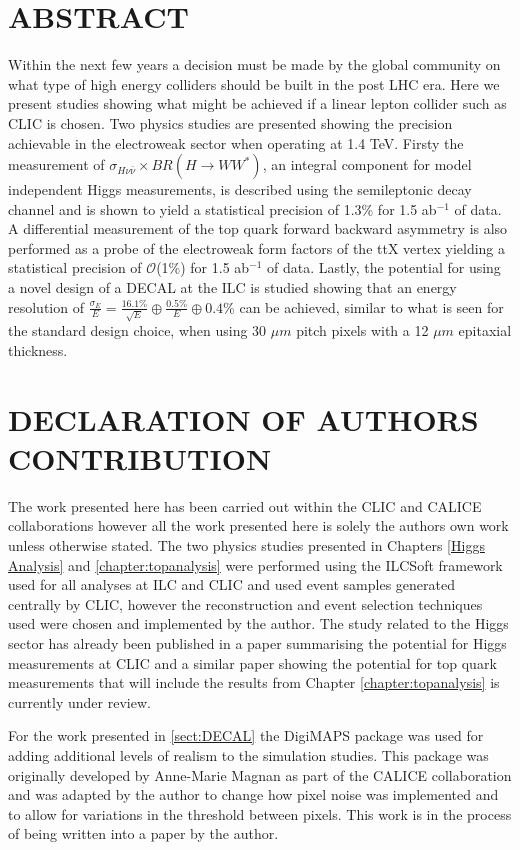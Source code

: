 \chapter*{ABSTRACT}
%
Within the next few years a decision must be made by the global community on what type of high energy colliders should be built in the post LHC era. Here we present studies showing what might be achieved if a linear lepton collider such as \ac{CLIC} is chosen. Two physics studies are presented showing the precision achievable in the electroweak sector when operating at 1.4 TeV. Firsty the measurement of $\sigma_{H\nu\bar{\nu}} \times BR(H\rightarrow WW^*)$, an integral component for model independent Higgs measurements, is described using the semileptonic decay channel and is shown to yield a statistical precision of 1.3\% for 1.5 ab$^{-1}$ of data. A differential measurement of the top quark forward backward asymmetry is also performed as a probe of the electroweak form factors of the ttX vertex yielding a statistical precision of $\mathcal{O}$(1\%) for 1.5 ab$^{-1}$ of data. Lastly, the potential for using a novel design of a \ac{DECAL} at the \ac{ILC} is studied showing that an energy resolution of $\frac{\sigma_E}{E}=\frac{16.1\%}{\sqrt{E}} \oplus \frac{0.5\%}{E} \oplus 0.4\%$ can be achieved, similar to what is seen for the standard design choice, when using 30 $\mu m$ pitch pixels with a 12 $\mu m$ epitaxial thickness.

%
\clearpage
\chapter*{DECLARATION OF AUTHORS CONTRIBUTION}
%
The work presented here has been carried out within the \ac{CLIC} and \ac{CALICE} collaborations however all the work presented here is solely the authors own work unless otherwise stated. The two physics studies presented in Chapters \ref{Higgs Analysis} and \ref{chapter:topanalysis} were performed using the ILCSoft framework used for all analyses at \ac{ILC} and \ac{CLIC} and used event samples generated centrally by \ac{CLIC}, however the reconstruction and event selection techniques used were chosen and implemented by the author. The study related to the Higgs sector has already been published in a paper summarising the potential for Higgs measurements\cite{Abramowicz:2016zbo} at \ac{CLIC} and a similar paper showing the potential for top quark measurements that will include the results from Chapter \ref{chapter:topanalysis} is currently under review.

For the work presented in \ref{sect:DECAL} the DigiMAPS package was used for adding additional levels of realism to the simulation studies. This package was originally developed by Anne-Marie Magnan as part of the \ac{CALICE} collaboration and was adapted by the author to change how pixel noise was implemented and to allow for variations in the threshold between pixels. This work is in the process of being written into a paper by the author.

